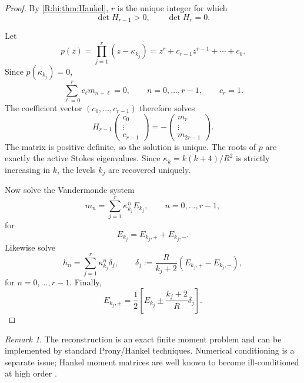 \documentclass[
 aps,
 prd,
 reprint,
 amsmath,
 amssymb,
 nofootinbib,
 superscriptaddress
]{revtex4-2}
\theoremstyle{definition}
\theoremstyle{remark}
\newtheorem{remark}[theorem]{Remark}
\begin{document}
\begin{proof}
By \cref{R:hi:thm:Hankel}, $r$ is the unique integer for which
\[
       \det H_{r-1}>0,
       \qquad
       \det H_r=0.
\]

Let
\[
 p(z)
 =
 \prod_{j=1}^r(z-\kappa_{k_j})
 =
 z^r+c_{r-1}z^{r-1}+\cdots+c_0.
\]
Since $p(\kappa_{k_j})=0$,
\begin{equation}
 \sum_{\ell=0}^r
 c_\ell m_{n+\ell}
 =
 0,
 \qquad
 n=0,\ldots,r-1,
 \qquad
 c_r=1.
 \label{R:hi:eq:recurrence}
\end{equation}
The coefficient vector $(c_0,\ldots,c_{r-1})$ therefore solves
\begin{equation}
 H_{r-1}
 \begin{pmatrix}
 c_0\\ \vdots\\ c_{r-1}
 \end{pmatrix}
 =
 -
 \begin{pmatrix}
 m_r\\ \vdots\\ m_{2r-1}
 \end{pmatrix}.
 \label{R:hi:eq:annihilator}
\end{equation}
The matrix is positive definite, so the solution is unique.  The roots of
$p$ are exactly the active Stokes eigenvalues.  Since
$\kappa_k=k(k+4)/R^2$ is strictly increasing in $k$, the levels $k_j$ are
recovered uniquely.

Now solve the Vandermonde system
\begin{equation}
 m_n
 =
 \sum_{j=1}^r
 \kappa_{k_j}^n E_{k_j},
 \qquad
 n=0,\ldots,r-1,
 \label{R:hi:eq:totalVandermonde}
\end{equation}
for
\[
       E_{k_j}=E_{k_j,+}+E_{k_j,-}.
\]
Likewise solve
\begin{equation}
 h_n
 =
 \sum_{j=1}^r
 \kappa_{k_j}^n\delta_j,
 \qquad
 \delta_j
 :=
 \frac{R}{k_j+2}
 (E_{k_j,+}-E_{k_j,-}),
 \label{R:hi:eq:signedVandermonde}
\end{equation}
for $n=0,\ldots,r-1$.  Finally,
\begin{equation}
 \boxed{
 E_{k_j,\pm}
 =
 \frac12
 \left[
 E_{k_j}
 \pm
 \frac{k_j+2}{R}\delta_j
 \right].
 }
 \label{R:hi:eq:recoverenergies}
\end{equation}
\end{proof}

\begin{remark}
The reconstruction is an exact finite moment problem and can be implemented
by standard Prony/Hankel techniques.  Numerical conditioning is a separate
issue; Hankel moment matrices are well known to become ill-conditioned at
high order \cite{Fasino1995}.
\end{remark}
\end{document}
